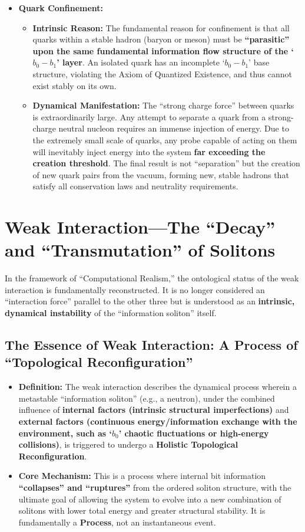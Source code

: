 \documentclass[11pt, a4paper]{article}
\begin{document}
\begin{itemize}
    \item \textbf{Quark Confinement:}
    \begin{itemize}
        \item \textbf{Intrinsic Reason:} The fundamental reason for confinement is that all quarks within a stable hadron (baryon or meson) must be \textbf{``parasitic'' upon the same fundamental information flow structure of the `$b_0-b_1$' layer}. An isolated quark has an incomplete `$b_0-b_1$' base structure, violating the Axiom of Quantized Existence, and thus cannot exist stably on its own.
        \item \textbf{Dynamical Manifestation:} The ``strong charge force'' between quarks is extraordinarily large. Any attempt to separate a quark from a strong-charge neutral nucleon requires an immense injection of energy. Due to the extremely small scale of quarks, any probe capable of acting on them will inevitably inject energy into the system \textbf{far exceeding the creation threshold}. The final result is not ``separation'' but the creation of new quark pairs from the vacuum, forming new, stable hadrons that satisfy all conservation laws and neutrality requirements.
    \end{itemize}
\end{itemize}

\section{Weak Interaction---The ``Decay'' and ``Transmutation'' of Solitons}

In the framework of ``Computational Realism,'' the ontological status of the weak interaction is fundamentally reconstructed. It is no longer considered an ``interaction force'' parallel to the other three but is understood as an \textbf{intrinsic, dynamical instability} of the ``information soliton'' itself.

\subsection{The Essence of Weak Interaction: A Process of ``Topological Reconfiguration''}

\begin{itemize}
    \item \textbf{Definition:} The weak interaction describes the dynamical process wherein a metastable ``information soliton'' (e.g., a neutron), under the combined influence of \textbf{internal factors (intrinsic structural imperfections)} and \textbf{external factors (continuous energy/information exchange with the environment, such as `$b_0$' chaotic fluctuations or high-energy collisions)}, is triggered to undergo a \textbf{Holistic Topological Reconfiguration}.
    \item \textbf{Core Mechanism:} This is a process where internal bit information \textbf{``collapses'' and ``ruptures''} from the ordered soliton structure, with the ultimate goal of allowing the system to evolve into a new combination of solitons with lower total energy and greater structural stability. It is fundamentally a \textbf{Process}, not an instantaneous event.
\end{itemize}
\end{document}
